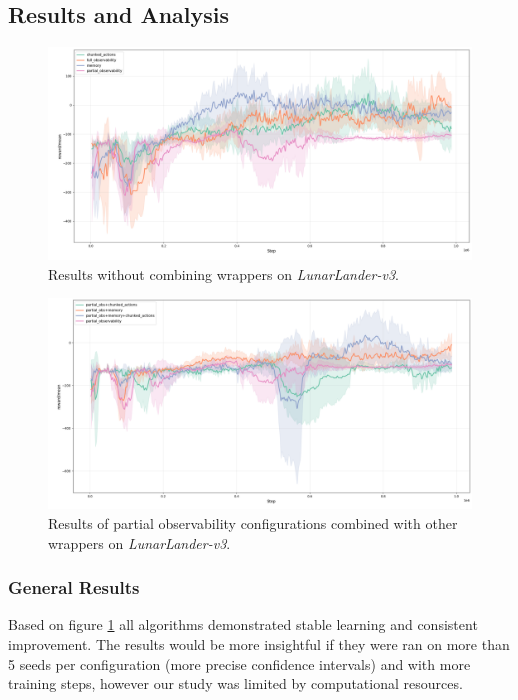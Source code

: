 \documentclass[12pt, a4paper]{article}
\begin{document}
\subsection{Results and Analysis}

\begin{figure}[H]
	\centering
	\includegraphics[width=1\linewidth]{results_lunar_lander_basic}
	\caption{Results without combining wrappers on \textit{LunarLander-v3}.}
	\label{fig:resultslunarlanderbasic}
\end{figure}

\begin{figure}[H]
	\centering
	\includegraphics[width=1\linewidth]{results_lunar_lander_combined}
	\caption{Results of partial observability configurations combined with other wrappers on \textit{LunarLander-v3}.}
	\label{fig:resultslunarlandercombined}
\end{figure}


\subsubsection{General Results}

Based on figure \ref{fig:resultslunarlanderbasic} all algorithms demonstrated stable learning and consistent improvement. The results would be more insightful if they were ran on more than 5 seeds per configuration (more precise confidence intervals) and with more training steps, however our study was limited by computational resources.
\end{document}
